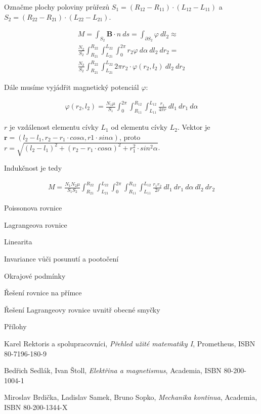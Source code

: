\documentclass{book}
\newcommand{\vect}[1]{\boldsymbol{#1}}
\begin{document}
Označme plochy poloviny průřezů \(S_1 = (R_{12} - R_{11}) \cdot (L_{12} - L_{11})\) a \(S_2 = (R_{22} - R_{21}) \cdot (L_{22} - L_{21})\).

\begin{equation}
\label{eq:aproximace_plochy}
\begin{split}
M = \int_{S_2} \vect{B} \cdot {n} \ ds = \int_{\partial S_2} \varphi \ dl_2 \approx \\
\frac{N_2}{S_2} \int_{R_{21}}^{R_{22}} \int_{L_{21}}^{L_{22}} \int_{0}^{2 \pi} r_2 \varphi \ d\alpha \ dl_2 \ dr_2 = \\
\frac{N_2}{S_2} \int_{R_{21}}^{R_{22}} \int_{L_{21}}^{L_{22}} 2 \pi r_2 \cdot \varphi(r_2, l_2) \ dl_2 \ dr_2 
\end{split}
\end{equation}

Dále musíme vyjádřit magnetický potenciál \(\varphi\):

\begin{equation}
\label{eq:civky_potencial}
\begin{split}
\varphi(r_2, l_2) = \frac{N_1 \mu}{S_1} \int_{0}^{2 \pi} \int_{R_{11}}^{R_{12}} \int_{L_{11}}^{L_{12}} \frac{r_1}{4 \pi r}  \ dl_1 \ dr_1 \ d \alpha
\end{split}
\end{equation}

\(r\) je vzdálenost elementu cívky \(L_1\) od elementu cívky \(L_2\). Vektor je \(\vect{r} = (l_2 - l_1, r_2 - r_1 \cdot cos \alpha, r1 \cdot sin \alpha)\), proto \(r = \sqrt{(l_2 - l_1)^2 + (r_2 - r_1 \cdot cos \alpha)^2 + r_1^2 \cdot sin^2 \alpha}\).

Indukčnost je tedy

\begin{equation}
\label{eq:indukcnost_1}
\begin{split}
M = \frac{N_1 N_2 \mu}{S_1 S_2} \int_{R_{21}}^{R_{22}} \int_{L_{21}}^{L_{22}} \int_{0}^{2 \pi} \int_{R_{11}}^{R_{12}} \int_{L_{11}}^{L_{12}} \frac{r_1 r_2}{2 r} \ dl_1 \ dr_1 \ d \alpha \ dl_2 \ dr_2
\end{split}
\end{equation}

Poissonova rovnice

Lagrangeova rovnice

Linearita

Invariance vůči posunutí a pootočení

Okrajové podmínky

Řešení rovnice na přímce

Řešení Lagrangeovy rovnice uvnitř obecné smyčky

Přílohy

\begin{thebibliography}{9}

Karel Rektoris a spolupracovníci,
\textit{Přehled užité matematiky I},
Prometheus,
ISBN 80-7196-180-9

Bedřich Sedlák, Ivan Štoll,
\textit{Elektřina a magnetismus},
Academia,
ISBN 80-200-1004-1

Miroslav Brdička, Ladislav Samek, Bruno Sopko,
\textit{Mechanika kontinua},
Academia,
ISBN 80-200-1344-X


\end{thebibliography}
\end{document}

